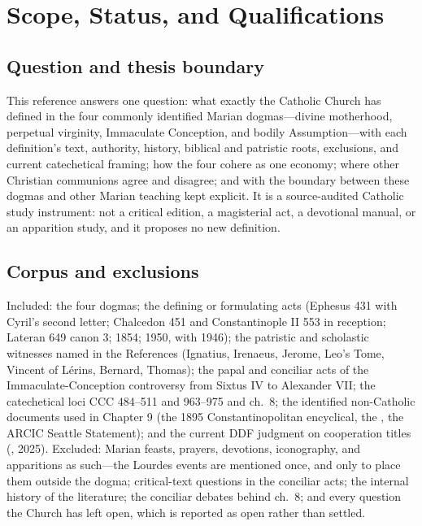 \sectionguard
\section{Scope, Status, and Qualifications}

\subsection*{Question and thesis boundary}

This reference answers one question: what exactly the Catholic Church
has defined in the four commonly identified Marian dogmas---divine
motherhood, perpetual virginity, Immaculate Conception, and bodily
Assumption---with each definition's text, authority, history, biblical
and patristic roots, exclusions, and current catechetical framing; how
the four cohere as one economy; where other Christian communions agree
and disagree; and with the boundary between these dogmas and other Marian
teaching kept explicit. It is a source-audited Catholic study instrument:
not a critical edition, a magisterial act, a devotional manual, or an
apparition study, and it proposes no new definition.

\subsection*{Corpus and exclusions}

Included: the four dogmas; the defining or formulating acts (Ephesus 431
with Cyril's second letter; Chalcedon 451 and Constantinople II 553 in
reception; Lateran 649 canon 3;  1854;
 1950, with 
1946); the patristic and scholastic witnesses named in the References
(Ignatius, Irenaeus, Jerome, Leo's Tome, Vincent of L\'erins, Bernard,
Thomas); the papal and conciliar acts of the Immaculate-Conception
controversy from Sixtus IV to Alexander VII; the catechetical loci CCC
484--511 and 963--975 and  ch.~8; the identified
non-Catholic documents used in Chapter 9 (the 1895 Constantinopolitan
encyclical, the , the ARCIC Seattle Statement);
and the current DDF judgment on cooperation titles (, 2025). Excluded: Marian feasts, prayers, devotions,
iconography, and apparitions as such---the Lourdes events are mentioned
once, and only to place them outside the dogma; critical-text questions
in the conciliar acts; the internal history of the 
literature; the conciliar debates behind  ch.~8; and
every question the Church has left open, which is reported as open rather
than settled.

